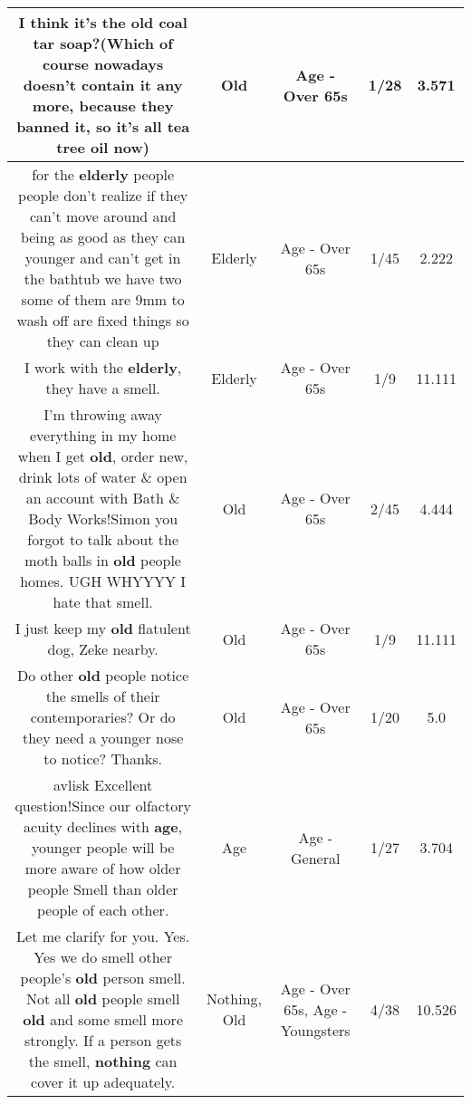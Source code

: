 \documentclass[11pt]{article}
\newlength\mylength
\begin{document}
\begin{center}
\begin{longtable}{|C{.65\mylength}|C{.30\mylength}|C{.12\mylength}|C{.12\mylength}|C{.12\mylength}|}
  \small I think it's the \textbf{old} coal tar soap?(Which of course nowadays doesn't contain it any more, because they banned it, so it's all tea tree oil now)\normalsize   & Old & Age - Over 65s & 1/28 & 3.571 \\  \hline
  \small for the \textbf{elderly} people people don't realize if they can't move around and being as good as they can younger and can't get in the bathtub we have two some of them are 9mm to wash off are fixed things so they can clean up\normalsize   & Elderly & Age - Over 65s & 1/45 & 2.222 \\  \hline
  \small I work with the \textbf{elderly}, they have a smell.\normalsize   & Elderly & Age - Over 65s & 1/9 & 11.111 \\  \hline
  \small I'm throwing away everything in my home when I get \textbf{old}, order new, drink lots of water \& open an account with Bath \& Body Works!Simon you forgot to talk about the moth balls in \textbf{old} people homes. UGH WHYYYY I hate that smell.\normalsize   & Old & Age - Over 65s & 2/45 & 4.444 \\  \hline
  \small I just keep my \textbf{old} flatulent dog, Zeke nearby.\normalsize   & Old & Age - Over 65s & 1/9 & 11.111 \\  \hline
  \small Do other \textbf{old} people notice the smells of their contemporaries? Or do they need a younger nose to notice? Thanks.\normalsize   & Old & Age - Over 65s & 1/20 & 5.0 \\  \hline
  \small avlisk Excellent question!Since our olfactory acuity declines with \textbf{age}, younger people will be more aware of how older people Smell than older people of each other.\normalsize   & Age & Age - General & 1/27 & 3.704 \\  \hline
  \small Let me clarify for you. Yes. Yes we do smell other people's \textbf{old} person smell. Not all \textbf{old} people smell \textbf{old} and some smell more strongly. If a person gets the smell, \textbf{nothing} can cover it up adequately.\normalsize   & Nothing, Old & Age - Over 65s, Age - Youngsters & 4/38 & 10.526 \\  \hline

\end{longtable}
\end{center}
\end{document}

